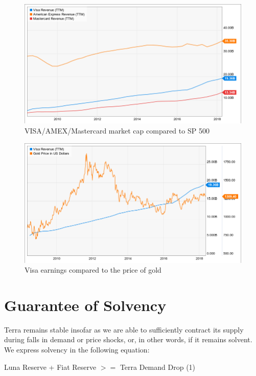 \documentclass{article}
\begin{document}
\begin{figure}
	\centering
	\includegraphics[scale=0.35]{fig2.png}
	\caption[]
	{VISA/AMEX/Mastercard market cap compared to SP 500}
\end{figure}

\begin{figure}
	\centering
	\includegraphics[scale=0.35]{fig3.png}
	\caption[]
	{Visa earnings compared to the price of gold}
\end{figure}


\newpage

\section{Guarantee of Solvency}

Terra remains stable insofar as we are able to sufficiently contract its supply during falls in demand or price shocks, or, in other words, if it remains solvent. We express solvency in the following equation:

\begin{center}
    Luna Reserve + Fiat Reserve ${>=}$ Terra Demand Drop (1)
\end{center}
\end{document}
